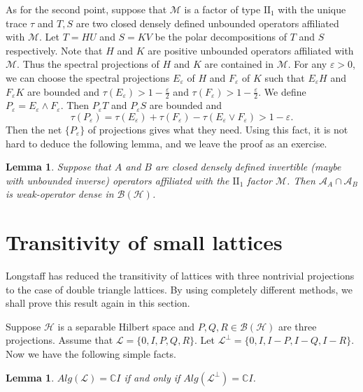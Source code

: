 \documentclass{jaums}
\theoremstyle{thmit} %
\newtheorem{lemma}[theorem]{Lemma}
\theoremstyle{thmrm} %
\begin{document}
As for the second point, suppose that $\mathcal{M}$ is a factor of type
$\mathrm{II}_1$ with the unique trace $\tau$ and $T,S$ are two closed densely
defined
unbounded operators affiliated with $\mathcal{M}$. Let $T=HU$ and $S=KV$ be the
polar decompositions of $T$ and $S$ respectively. Note that $H$ and $K$ are
positive unbounded operators affiliated with $\mathcal{M}$. Thus the spectral
projections of $H$ and $K$ are contained in $\mathcal{M}$. For any
$\varepsilon>0$, we can choose the spectral projections $E_{\varepsilon}$ of $H$
and $F_{\varepsilon}$ of $K$ such that $E_{\varepsilon}H$
and $F_{\varepsilon}K$ are bounded and
$\tau(E_{\varepsilon})>1-\frac{\varepsilon}{2}$ and
$\tau(F_{\varepsilon})>1-\frac{\varepsilon}{2}$. We define
$P_{\varepsilon}=E_{\varepsilon}\wedge F_{\varepsilon}$. Then $P_{\varepsilon}T$
and $P_{\varepsilon}S$ are bounded and
$$\tau(P_{\varepsilon})=\tau(E_{\varepsilon})+\tau(F_{\varepsilon})-\tau(E_{
\varepsilon}\vee F_{\varepsilon})>1-\varepsilon.$$
Then the net $\{P_{\varepsilon}\}$ of projections gives what they need. Using
this fact, it is not hard to deduce the following lemma, and we leave the
proof as an exercise.

\begin{lemma} Suppose that $A$ and $B$ are closed densely defined invertible
(maybe with unbounded inverse) operators affiliated with the $\mathrm{II}_1$
factor $\mathcal{M}$. Then $\mathcal{A}_A\cap \mathcal{A}_B$ is weak-operator
dense in $\mathcal{B}(\mathcal{H})$.
\end{lemma}


\section{Transitivity of small lattices}

Longstaff {\cite{[Lo]}} has reduced the transitivity of lattices with three
nontrivial projections to the case of double triangle lattices. By using
completely different methods, we shall prove this result again in this section.

Suppose $\mathcal{H}$ is a separable Hilbert space and
$P,Q,R\in\mathcal{B}(\mathcal{H})$ are three projections.
Assume that $\mathcal{L}=\{0,I,P,Q,R\}$. Let
$\mathcal{L}^{\perp}=\{0,I,I-P,I-Q,I-R\}$. Now we have the following simple
facts.

\begin{lemma} $Alg(\mathcal{L})=\mathbb{C}I$ if and only if
$Alg(\mathcal{L}^{\perp})=\mathbb{C}I$.
\end{lemma}
\end{document}
